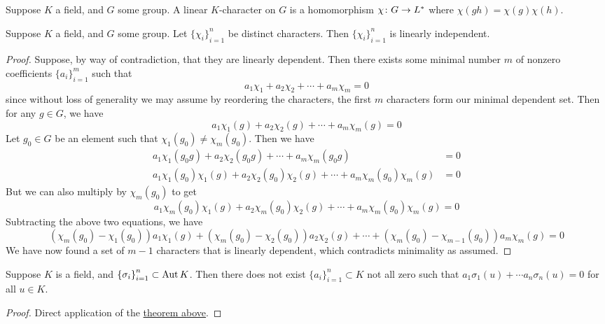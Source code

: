 \begin{definition}
    Suppose \(K\) a field, and \(G\) some group.
    A linear \(K\)-character on \(G\) is a homomorphism \(\chi\colon G\to L^\ast\)
    where \(\chi(gh) = \chi(g)\chi(h)\).
\end{definition}
\begin{theorem}\label{thm:linear-independent-characters}
    Suppose \(K\) a field, and \(G\) some group.
    Let \({\{\chi_i\}}_{i=1}^n\) be distinct characters.
    Then \({\{\chi_i\}}_{i=1}^n\) is linearly independent.
\end{theorem}
\begin{proof}
    Suppose, by way of contradiction,
    that they are linearly dependent.
    Then there exists some minimal number \(m\) of nonzero coefficients \({\{a_i\}}_{i=1}^m\)
    such that
    \begin{equation*}
        a_1\chi_1 + a_2\chi_2 + \cdots + a_m\chi_m = 0
    \end{equation*}
    since without loss of generality we may assume by reordering the characters,
    the first \(m\) characters form our minimal dependent set.
    Then for any \(g \in G\), we have
    \begin{equation*}
        a_1\chi_1(g) + a_2\chi_2(g) + \cdots + a_m\chi_m(g) = 0
    \end{equation*}
    Let \(g_0 \in G\) be an element such that \(\chi_1(g_0) \neq \chi_m(g_0)\).
    Then we have
    \begin{align*}
        a_1\chi_1(g_0g) + a_2\chi_2(g_0g) + \cdots + a_m\chi_m(g_0g) &= 0 \\
        a_1\chi_1(g_0)\chi_1(g) + a_2\chi_2(g_0)\chi_2(g) + \cdots + a_m\chi_m(g_0)\chi_m(g) &= 0
    \end{align*}
    But we can also multiply by \(\chi_m(g_0)\) to get
    \begin{equation*}
        a_1\chi_m(g_0)\chi_1(g) + a_2\chi_m(g_0)\chi_2(g) + \cdots + a_m\chi_m(g_0)\chi_m(g) = 0
    \end{equation*}
    Subtracting the above two equations, we have
    \begin{equation*}
        (\chi_m(g_0)-\chi_1(g_0))a_1\chi_1(g) + (\chi_m(g_0)-\chi_2(g_0))a_2\chi_2(g)
        + \cdots + (\chi_m(g_0)-\chi_{m-1}(g_0))a_m\chi_m(g) = 0
    \end{equation*}
    We have now found a set of \(m-1\) characters that is linearly dependent,
    which contradicts minimality as assumed.
\end{proof}
\begin{corollary}\label{cor:dedekind}\label{lem:dedekind}
    Suppose \(K\) is a field, and \({\{\sigma_i\}}_{i=1}^n \subset \operatorname{Aut} K\).
    Then there does not exist \({\{a_i\}}_{i=1}^n \subset K\) not all zero
    such that \(a_1\sigma_1(u) + \cdots a_n\sigma_n(u) = 0\) for all \(u \in K\).
\end{corollary}
\begin{proof}
    Direct application of the \hyperref[thm:linear-independent-characters]{theorem above}.
\end{proof}

